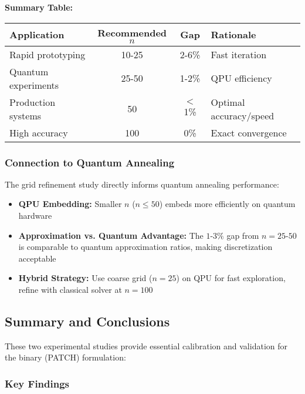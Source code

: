 \documentclass{article}
\begin{document}
\textbf{Summary Table:}

\begin{center}
\begin{tabular}{lccl}
\hline
\textbf{Application} & \textbf{Recommended $n$} & \textbf{Gap} & \textbf{Rationale} \\
\hline
Rapid prototyping & 10-25 & 2-6\% & Fast iteration \\
Quantum experiments & 25-50 & 1-2\% & QPU efficiency \\
Production systems & 50 & $<$1\% & Optimal accuracy/speed \\
High accuracy & 100 & 0\% & Exact convergence \\
\hline
\end{tabular}
\end{center}

\subsubsection{Connection to Quantum Annealing}

The grid refinement study directly informs quantum annealing performance:

\begin{itemize}
    \item \textbf{QPU Embedding:} Smaller $n$ ($n \leq 50$) embeds more efficiently on quantum hardware
    \item \textbf{Approximation vs. Quantum Advantage:} The $1$-$3\%$ gap from $n = 25$-$50$ is comparable to quantum approximation ratios, making discretization acceptable
    \item \textbf{Hybrid Strategy:} Use coarse grid ($n = 25$) on QPU for fast exploration, refine with classical solver at $n = 100$
\end{itemize}

\subsection{Summary and Conclusions}

These two experimental studies provide essential calibration and validation for the binary (PATCH) formulation:

\subsubsection{Key Findings}
\end{document}
